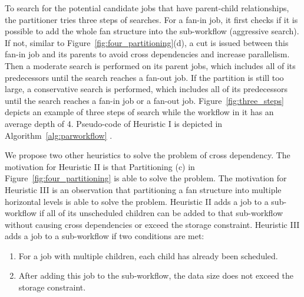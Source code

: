 To search for the potential candidate jobs that have parent-child relationships, the partitioner tries three steps of searches. For a fan-in job, it first checks if it is possible to add the whole fan structure into the sub-workflow (aggressive search). If not, similar to Figure~\ref{fig:four_partitioning}(d), a cut is issued between this fan-in job and its parents to avoid cross dependencies and increase parallelism. Then a moderate search is performed on its parent jobs, which includes all of its predecessors until the search reaches a fan-out job. If the partition is still too large, a conservative search is performed, which includes all of its predecessors until the search reaches a fan-in job or a fan-out job. Figure~\ref{fig:three_steps} depicts an example of three steps of search while the workflow in it has an average depth of 4. Pseudo-code of Heuristic I is depicted in Algorithm~\ref{alg:parworkflow} .


We propose two other heuristics to solve the problem of cross dependency. The motivation for Heuristic II is that Partitioning (c) in Figure~\ref{fig:four_partitioning} is able to solve the problem. The motivation for Heuristic III is an observation that partitioning a fan structure into multiple horizontal levels is able to solve the problem. Heuristic II adds a job to a sub-workflow if all of its unscheduled children can be added to that sub-workflow without causing cross dependencies or exceed the storage constraint. Heuristic III adds a job to a sub-workflow if two conditions are met: 
\begin{enumerate}
\item For a job with multiple children, each child has already been scheduled.
\item After adding this job to the sub-workflow, the data size does not exceed the storage constraint.  
\end{enumerate}


